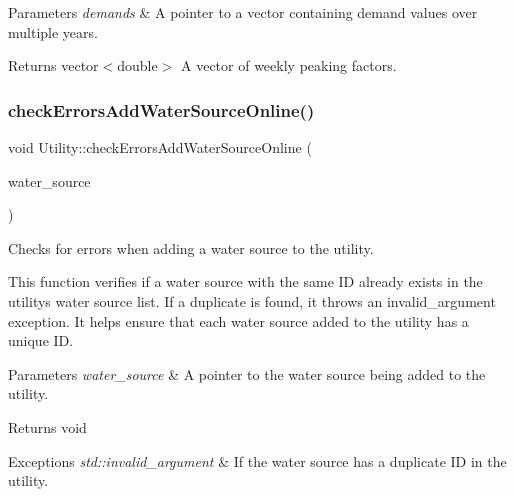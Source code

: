 \begin{DoxyParams}{Parameters}
{\em demands} & A pointer to a vector containing demand values over multiple years.\\
\hline
\end{DoxyParams}
\begin{DoxyReturn}{Returns}
vector$<$double$>$ A vector of weekly peaking factors. 
\end{DoxyReturn}
\mbox{\label{classUtility_a0674d7d95f4d6595f7e01817a4d84a98}} 
\subsubsection{\texorpdfstring{check\+Errors\+Add\+Water\+Source\+Online()}{checkErrorsAddWaterSourceOnline()}}
{\footnotesize\ttfamily void Utility\+::check\+Errors\+Add\+Water\+Source\+Online (\begin{DoxyParamCaption}\item[{\mbox{\hyperlink{classWaterSource}{Water\+Source}} $\ast$}]{water\+\_\+source }\end{DoxyParamCaption})}



Checks for errors when adding a water source to the utility. 

This function verifies if a water source with the same ID already exists in the utility\textquotesingle{}s water source list. If a duplicate is found, it throws an invalid\+\_\+argument exception. It helps ensure that each water source added to the utility has a unique ID. 
\begin{DoxyParams}{Parameters}
{\em water\+\_\+source} & A pointer to the water source being added to the utility.\\
\hline
\end{DoxyParams}
\begin{DoxyReturn}{Returns}
void
\end{DoxyReturn}

\begin{DoxyExceptions}{Exceptions}
{\em std\+::invalid\+\_\+argument} & If the water source has a duplicate ID in the utility. \\
\hline
\end{DoxyExceptions}
\mbox{\label{classUtility_aa770f28c76e84747bbd643f55dbc4dd5}} 
